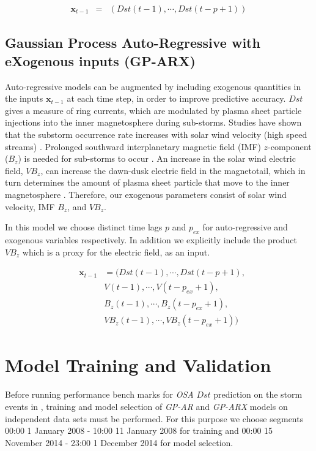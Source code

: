 \documentclass[draft,sw]{AGUTeX}
\begin{document}
\begin{article}
\begin{align*}
    \mathbf{x}_{t-1} & = & \left(Dst(t-1), \cdots , Dst(t-p+1)\right)
\end{align*}

\subsection{Gaussian Process Auto-Regressive with eXogenous inputs (GP-ARX)} \label{sec:gparx}

Auto-regressive models can be augmented by including exogenous quantities in the inputs $\mathbf{x}_{t-1}$ at each time step, in order to improve predictive accuracy. $Dst$ gives a measure of ring currents, which are modulated by plasma sheet particle injections into the inner magnetosphere during sub-storms. Studies have shown that the substorm occurrence rate increases with solar wind velocity (high speed streams) \citep{Kissinger2011,Newell2016}. Prolonged southward interplanetary magnetic field (IMF) $z$-component ($B_z$) is needed for sub-storms to occur \citep{McPherron1986}. An increase in the solar wind electric field, $VB_z$, can increase the dawn-dusk electric field in the magnetotail, which in turn determines the amount of plasma sheet particle that move to the inner magnetosphere \citep{Friedel2001}. Therefore, our exogenous parameters consist of solar wind velocity, IMF $B_z$, and $VB_z$.   

In this model we choose distinct time lags $p$ and $p_{ex}$ for auto-regressive and exogenous variables respectively. In addition we explicitly include the product $V B_z$ which is a proxy for the electric field, as an input.
    
\begin{align*}
        & \mathbf{x}_{t-1} & = (Dst(t-1), \cdots , Dst(t-p+1), \\
        & \ \ \ \ \ & V(t-1), \cdots, V(t-p_{ex}+1),\\
        & \ \ \ \ \ & B_{z}(t-1), \cdots, B_{z}(t-p_{ex}+1),\\
        & \ \ \ \ \ & V B_{z}(t-1), \cdots, V B_{z}(t-p_{ex}+1))
\end{align*}

\section{Model Training and Validation}

Before running performance bench marks for \emph{OSA} $Dst$ prediction on the storm events in \citet{Ji2012}, training and model selection of \emph{GP-AR} and \emph{GP-ARX} models on independent data sets must be performed. For this purpose we choose segments 00:00 1 January 2008 - 10:00 11 January 2008 for training and 00:00 15 November 2014 - 23:00 1 December 2014 for model selection. 


\end{article}
\end{document}

